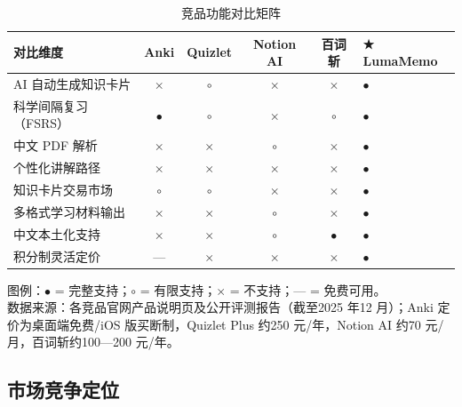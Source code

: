 \begin{table}[htbp]
  \centering
  \caption{竞品功能对比矩阵}
  \label{tab:chap02_competitor}
  \small
  \begin{tabular}{p{3.8cm}ccccp{2.2cm}}
    \toprule
    \textbf{对比维度} & \textbf{Anki} & \textbf{Quizlet} & \textbf{Notion AI} & \textbf{百词斩} & \textbf{★\,LumaMemo} \\
    \midrule
    AI 自动生成知识卡片    & $\times$ & $\circ$ & $\times$ & $\times$ & $\bullet$ \\
    科学间隔复习（FSRS）   & $\bullet$ & $\circ$ & $\times$ & $\circ$ & $\bullet$ \\
    中文 PDF 解析          & $\times$ & $\times$ & $\circ$ & $\times$ & $\bullet$ \\
    个性化讲解路径         & $\times$ & $\times$ & $\times$ & $\times$ & $\bullet$ \\
    知识卡片交易市场       & $\circ$ & $\circ$ & $\times$ & $\times$ & $\bullet$ \\
    多格式学习材料输出     & $\times$ & $\times$ & $\circ$ & $\times$ & $\bullet$ \\
    中文本土化支持         & $\times$ & $\times$ & $\circ$ & $\bullet$ & $\bullet$ \\
    积分制灵活定价         & — & $\times$ & $\times$ & $\times$ & $\bullet$ \\
    \bottomrule
  \end{tabular}
  \begin{flushleft}
    \footnotesize 图例：$\bullet$ = 完整支持；$\circ$ = 有限支持；$\times$ = 不支持；— = 免费可用。\\
    数据来源：各竞品官网产品说明页及公开评测报告（截至2025 年12 月）；Anki 定价为桌面端免费/iOS 版买断制，Quizlet Plus 约250 元/年，Notion AI 约70 元/月，百词斩约100—200 元/年。
  \end{flushleft}
\end{table}

\subsection{市场竞争定位}

